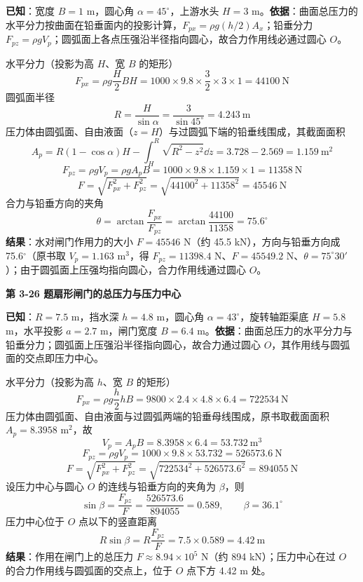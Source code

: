 \begin{jie}
\textbf{已知}：宽度 $B=1$ m，圆心角 $\alpha=45^\circ$，上游水头 $H=3$ m。\textbf{依据}：曲面总压力的水平分力按曲面在铅垂面内的投影计算，$F_{px}=\rho g(h/2)A_x$；铅垂分力 $F_{pz}=\rho gV_p$；圆弧面上各点压强沿半径指向圆心，故合力作用线必通过圆心 $O$。

水平分力（投影为高 $H$、宽 $B$ 的矩形）
\[ F_{px}=\rho g\frac{H}{2}BH=1000\times9.8\times\frac{3}{2}\times3\times1=44100\ \mathrm{N} \]
圆弧面半径
\[ R=\frac{H}{\sin\alpha}=\frac{3}{\sin45^\circ}=4.243\ \mathrm{m} \]
压力体由圆弧面、自由液面（$z=H$）与过圆弧下端的铅垂线围成，其截面面积
\[ A_p=R(1-\cos\alpha)H-\int_{H}^{R}\sqrt{R^2-z^2}\dd z=3.728-2.569=1.159\ \mathrm{m^2} \]
\[ F_{pz}=\rho gV_p=\rho gA_pB=1000\times9.8\times1.159\times1=11358\ \mathrm{N} \]
\[ F=\sqrt{F_{px}^2+F_{pz}^2}=\sqrt{44100^2+11358^2}=45546\ \mathrm{N} \]
合力与铅垂方向的夹角
\[ \theta=\arctan\frac{F_{px}}{F_{pz}}=\arctan\frac{44100}{11358}=75.6^\circ \]
\textbf{结果}：水对闸门作用力的大小 $F=45546$ N（约 45.5 kN），方向与铅垂方向成 75.6$^\circ$（原书取 $V_p=1.163$ m$^3$，得 $F_{pz}=11398.4$ N、$F=45549.2$ N、$\theta=75^\circ30'$）；由于圆弧面上压强均指向圆心，合力作用线通过圆心 $O$。
\end{jie}

\noindent\textbf{第 3-26 题\quad 扇形闸门的总压力与压力中心}

\begin{jie}
\textbf{已知}：$R=7.5$ m，挡水深 $h=4.8$ m，圆心角 $\alpha=43^\circ$，旋转轴距渠底 $H=5.8$ m，水平投影 $a=2.7$ m，闸门宽度 $B=6.4$ m。\textbf{依据}：曲面总压力的水平分力与铅垂分力；圆弧面上压强沿半径指向圆心，故合力通过圆心 $O$，其作用线与圆弧面的交点即压力中心。

水平分力（投影为高 $h$、宽 $B$ 的矩形）
\[ F_{px}=\rho g\frac{h}{2}hB=9800\times2.4\times4.8\times6.4=722534\ \mathrm{N} \]
压力体由圆弧面、自由液面与过圆弧两端的铅垂母线围成，原书取截面面积 $A_p=8.3958$ m$^2$，故
\[ V_p=A_pB=8.3958\times6.4=53.732\ \mathrm{m^3} \]
\[ F_{pz}=\rho gV_p=1000\times9.8\times53.732=526573.6\ \mathrm{N} \]
\[ F=\sqrt{F_{px}^2+F_{pz}^2}=\sqrt{722534^2+526573.6^2}=894055\ \mathrm{N} \]
设压力中心与圆心 $O$ 的连线与铅垂方向的夹角为 $\beta$，则
\[ \sin\beta=\frac{F_{pz}}{F}=\frac{526573.6}{894055}=0.589,\qquad \beta=36.1^\circ \]
压力中心位于 $O$ 点以下的竖直距离
\[ R\sin\beta=R\frac{F_{pz}}{F}=7.5\times0.589=4.42\ \mathrm{m} \]
\textbf{结果}：作用在闸门上的总压力 $F\approx8.94\times10^5$ N（约 894 kN）；压力中心在过 $O$ 的合力作用线与圆弧面的交点上，位于 $O$ 点下方 4.42 m 处。
\end{jie}

